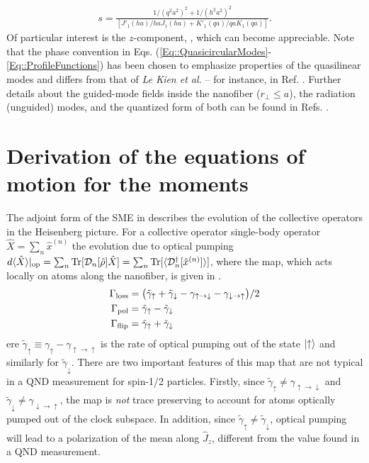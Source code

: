\documentclass[preprint,aps,pra,onecolumn]{revtex4-1} %
\newcommand{\gammaud}{\gamma_{\uparrow \rightarrow \downarrow}}
\newcommand{\gammadu}{\gamma_{\downarrow \rightarrow \uparrow}}
\newcommand{\gammap}{\tilde{\gamma}_\uparrow + \tilde{\gamma}_\downarrow}
\newcommand{\gammam}{\tilde{\gamma}_\uparrow - \tilde{\gamma}_\downarrow}
\newcommand{\frate}{\Gamma_{\rm flip}}
\newcommand{\lrate}{\Gamma_{\rm loss}}
\newcommand{\polrate}{\Gamma_{\rm pol}}
\begin{document}
\begin{appendix}
	\begin{align}
		s = \frac{1/(q^2 a^2)^{2} + 1/(h^2 a^2)^{2}}{[J'_1(ha)/haJ_1(ha) + K'_1(qa)/qaK_1(qa)]}.
	\end{align}  
Of particular interest is the $z$-component, , which can become appreciable.  Note that the phase convention in Eqs. (\ref{Eq::QuasicircularModes}-\ref{Eq::ProfileFunctions}) has been chosen to emphasize properties of the quasilinear modes and differs from that of \emph{Le Kien et al.} -- for instance, in Ref. \cite{le_kien_propagation_2014}.  Further details about the guided-mode fields inside the nanofiber ($r_\perp\leq a$), the radiation (unguided) modes, and the quantized form of both can be found in Refs. \cite{sondergaard_general_2001, tong_single-mode_2004, kien_field_2004, le_kien_spontaneous_2005, Vetsch thesis}.


\section{Derivation of the equations of motion for the moments} \label{Appendix::OpticalPumping}	
			
The adjoint form of the SME in  describes the evolution of the collective operators in the Heisenberg picture. For a collective operator single-body operator $\hat{X} = \sum_n \hat{x}^{(n)}$ the evolution due to optical pumping $d\langle{ \hat{X}}\rangle|_{\rm op} = \sum_n \mbox{Tr} [\mathcal{D}_n[\hat{\rho}]\hat{X} ] = \sum_n \mbox{Tr} [\langle{\mathcal{D}_n^\dagger[\hat{x}^{(n)}]}\rangle ] $, where the map, which acts locally on atoms along the nanofiber, is given in . %
	\begin{align}
		\lrate &= \big(\gammap - \gammaud - \gammadu \big)/2 \\
		\polrate& =  \gammam \\
		\frate& =  \gammap 
	\end{align}
ere $\tilde{\gamma}_\uparrow  \equiv \gamma_\uparrow - \gamma_{\uparrow \rightarrow \uparrow}$ is the rate of optical pumping out of the state $\lvert{\uparrow}\rangle$ and similarly for $\tilde{\gamma}_\downarrow$.
There are two important features of this map that are not typical in a QND measurement for spin-1/2 particles.  Firstly, since $\tilde{\gamma}_\uparrow \neq \gamma_{\uparrow \rightarrow \downarrow}$ and  $\tilde{\gamma}_\downarrow \neq \gamma_{\downarrow \rightarrow \uparrow}$, the map is {\em not} trace preserving to account for atoms optically pumped out of the clock subspace.  In addition, since $\tilde{\gamma}_\uparrow \neq \tilde{\gamma}_\downarrow$, optical pumping will lead to a polarization of the mean along $\hat{J}_z$, different from the value found in a QND measurement.	


\end{appendix}
\end{document}
